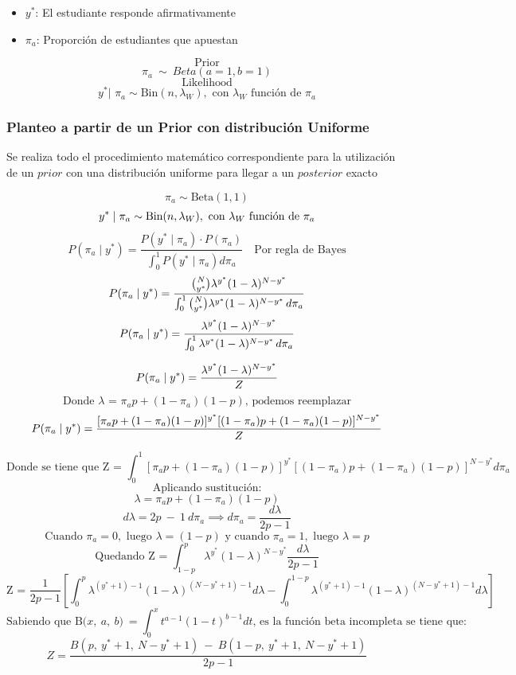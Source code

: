 \documentclass[
]{article}
\begin{document}
\begin{itemize}
\item
  \(y^*\): El estudiante responde afirmativamente
\item
  \(\pi_a\): Proporción de estudiantes que apuestan
\end{itemize}

\[\text{Prior}\] \[\pi_a \ \sim \ Beta(a = 1, b = 1)\]
\[\text{Likelihood}\]
\[y^* \text{| }\pi_a \sim \text{Bin}(n,\lambda_W), \text{ con } \lambda_W \text{ función de } \pi_a\]

\subsubsection{Planteo a partir de un Prior con distribución Uniforme}\label{subtitulo-6}

Se realiza todo el procedimiento matemático correspondiente para la utilización de un \(prior\) con una distribución uniforme para llegar a un \(posterior\) exacto

\[\pi_a \sim \text{Beta}(1,1)\]
\[y^* \mid \pi_a \sim \text{Bin}(n, \lambda_W),\text{ con } \lambda_W \text{ función de } \pi_a\\\]
\[P(\pi_a \mid y^*) = \dfrac{P(y^* \mid \pi_a) \cdot P(\pi_a)}{\int_{0}^{1} P(y^* \mid \pi_a)d\pi_a} \quad \text{Por regla de Bayes}\]
\[P(\pi_a \mid y^*) =  \dfrac{\binom{N}{y^*} \lambda^{y^*} (1 - \lambda)^{N - y^*}}{\int_{0}^{1} \binom{N}{y^*} \lambda^{y^*} (1 - \lambda)^{N - y^*} \, d\pi_a}\\\]
\[P(\pi_a \mid y^*) =  \dfrac{ \lambda^{y^*} (1 - \lambda)^{N - y^*}}{\int_{0}^{1} \lambda^{y^*} (1 - \lambda)^{N - y^*} \, d\pi_a}\\\]

\[P(\pi_a \mid y^*) = \dfrac{\lambda^{y^*} (1 - \lambda)^{N - y^*}}{Z}\\\]
\[\text{Donde }\lambda \text{ = } \pi_a p + (1 - \pi_a)(1 - p) \text{, podemos reemplazar}\]
\[P(\pi_a \mid y^*) = \dfrac{[\pi_a p + (1 - \pi_a)(1 - p)]^{y^*} [(1 - \pi_a)p + (1 - \pi_a)(1 - p)]^{N - y^*}}{Z}\\\]

\[\text{Donde se tiene que Z = } \int_{0}^{1} [\pi_a p + (1 - \pi_a)(1 - p)]^{y^*} [(1 - \pi_a)p + (1 - \pi_a)(1 - p)]^{N - y^*} d\pi_a\]
\[\text{Aplicando sustitución:}\]
\[\lambda = \pi_a p + (1 - \pi_a)(1 - p) \]
\[  d\lambda = 2p \ - \ 1 \ d\pi_a \implies d\pi_a = \dfrac{d\lambda}{2p-1}\]
\[\text{Cuando }\pi_a = 0, \text{ luego } \lambda = (1-p) \text{ y cuando }\pi_a =1, \text{ luego } \lambda= p\]
\[\text{Quedando Z = } \int_{1-p}^{p} \lambda^{y^*} (1 - \lambda)^{N - y^*} \dfrac{ d\lambda}{2p -1}\]
\[\text{Z = } \dfrac{1}{2p -1} \left[\int_{0}^{p} \lambda^{(y^*+1)-1} (1 - \lambda)^{(N - y^*+1)-1} d\lambda - \int_{0}^{1-p} \lambda^{(y^*+1)-1} (1 - \lambda)^{(N - y^*+1)-1} d\lambda\right]\]
\[\text{Sabiendo que B(}x,\ a,\ b)\ = \int_{0}^{x} t^{a-1}(1 - t)^{b-1} dt \text{, es la función beta incompleta se tiene que:}\]
\[Z = \dfrac{B(p,\ y^*+1,\ N-y^* +1)\ -\ B(1-p,\ y^*+1,\ N-y^* +1)}{2p-1}\]
\end{document}

